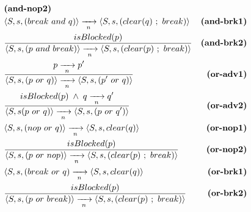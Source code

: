\begin{eqnarray*}
    & \textbf{(and-nop2)}   \\
& \LL S,s, (break~and~q) \RR \ST \LL S,s, (clear(q)~;~break) \RR
    & \textbf{(and-brk1)}   \\
& \frac
    {\DS isBlocked(p) }
    {\DS \LL S,s, (p~and~break) \RR \ST \LL S,s, (clear(p)~;~break) \RR }
    & \textbf{(and-brk2)}   \\
& \frac
    {\DS p \ST p' }
    {\DS \LL S,s, (p~or~q) \RR \ST \LL S,s, (p'~or~q) \RR }
    & \textbf{(or-adv1)}   \\
& \frac
    {\DS isBlocked(p) \1\wedge\1 q \ST q' }
    {\DS \LL S,s (p~or~q) \RR \ST \LL S,s, (p~or~q') \RR }
    & \textbf{(or-adv2)}   \\
& \LL S,s, (nop~or~q) \RR \ST \LL S,s, clear(q) \RR
    & \textbf{(or-nop1)}   \\
& \frac
    {\DS isBlocked(p) }
    {\DS \LL S,s, (p~or~nop) \RR \ST \LL S,s, (clear(p)~;~break) \RR }
    & \textbf{(or-nop2)}   \\
& \LL S,s, (break~or~q) \ST \LL S,s, clear(q) \RR
    & \textbf{(or-brk1)}   \\
& \frac
    {\DS isBlocked(p) }
    {\DS \LL S,s, (p~or~break) \RR \ST \LL S,s, (clear(p)~;~break) \RR }
    & \textbf{(or-brk2)}   %
\end{eqnarray*}


